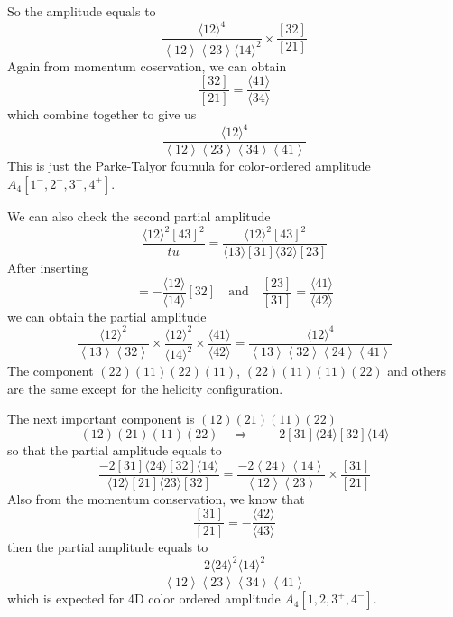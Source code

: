 \documentclass[12pt]{article}
\newcommand{\avg}[1]{\langle #1 \rangle}
\newcommand{\doubleavg}[2]{\left\langle #1 \right\rangle\!\left\langle #2 \right\rangle}
\newcommand{\cbrak}[2]{\avg{#1}\![#2]}
\newcommand{\acbrak}[2]{[#1]\!\avg{#2}}
\begin{document}
So the amplitude equals to
\begin{equation}
    \frac{\avg{12}^4}{\doubleavg{12}{23}\!\avg{14}^2}\times\frac{[32]}{[21]}
\end{equation}
Again from momentum coservation, we can obtain
\begin{equation}
    \frac{[32]}{[21]}=\frac{\avg{41}}{\avg{34}}
\end{equation}
which combine together to give us 
\begin{equation}
    \frac{\avg{12}^4}{\doubleavg{12}{23}\!\doubleavg{34}{41}}
\end{equation}
This is just the Parke-Talyor foumula for color-ordered amplitude $A_4[1^-,2^-,3^+,4^+]$.

We can also check the second partial amplitude
\begin{equation}
  \frac{\avg{12}^2[43]^2}{tu}=\frac{\avg{12}^2[43]^2}{\cbrak{13}{31}\cbrak{32}{23}}
\end{equation}
After inserting 
\begin{equation}
    [43]=-\frac{\avg{12}}{\avg{14}}[32]\quad \text{and} \quad \frac{[23]}{[31]}=\frac{\avg{41}}{\avg{42}}
\end{equation}
we can obtain the partial amplitude
\begin{equation}
    \frac{\avg{12}^2}{\doubleavg{13}{32}}\times\frac{\avg{12}^2}{\avg{14}^2}\times \frac{\avg{41}}{\avg{42}}=\frac{\avg{12}^4}{\doubleavg{13}{32}\!\doubleavg{24}{41}}
\end{equation}
The component $(22)(11)(22)(11)$, $(22)(11)(11)(22)$ and others are the same except for the helicity configuration.

The next important component is $(12)(21)(11)(22)$
\begin{equation}
    (12)(21)(11)(22)\quad \Rightarrow \quad -2\acbrak{31}{24}\!\acbrak{32}{14}
\end{equation}
so that the partial amplitude equals to
\begin{equation}
    \frac{-2\acbrak{31}{24}\!\acbrak{32}{14}}{\cbrak{12}{21}\!\cbrak{23}{32}}=\frac{-2\doubleavg{24}{14}}{\doubleavg{12}{23}}\times \frac{[31]}{[21]}
\end{equation}
Also from the momentum conservation, we know that
\begin{equation}
    \frac{[31]}{[21]}=-\frac{\avg{42}}{\avg{43}}
\end{equation}
then the partial amplitude equals to
\begin{equation}
    \frac{2\avg{24}^2\avg{14}^2}{\doubleavg{12}{23}\!\doubleavg{34}{41}}
\end{equation}
which is expected for 4D color ordered amplitude $A_4[1,2,3^+,4^-]$.
\end{document}
